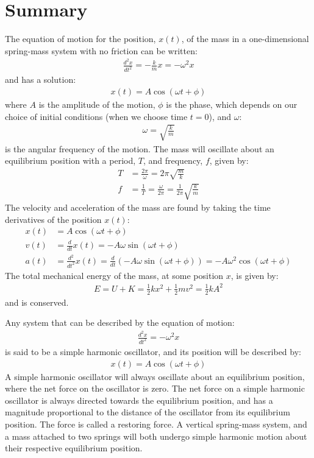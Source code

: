 \section{Summary}
\vspace{-0.25cm}
\begin{chapterSummary}
The equation of motion for the position, $x(t)$, of the mass in a one-dimensional spring-mass system with no friction can be written:
\begin{align*}
\frac{d^2x}{dt^2}=-\frac{k}{m}x = -\omega^2 x
\end{align*}
and has a solution:
\begin{align*}
x(t) = A\cos(\omega t + \phi)
\end{align*}
where $A$ is the amplitude of the motion, $\phi$ is the phase, which depends on our choice of initial conditions (when we choose time $t=0$), and $\omega$:
\begin{align*}
\omega = \sqrt{\frac{k}{m}}
\end{align*}
is the angular frequency of the motion. The mass will oscillate about an equilibrium position with a period, $T$, and frequency, $f$, given by:
\begin{align*}
T&=\frac{2\pi}{\omega}=2\pi\sqrt{\frac{m}{k}}\\
f&=\frac{1}{T}=\frac{\omega}{2\pi}=\frac{1}{2\pi}\sqrt{\frac{k}{m}}
\end{align*}
The velocity and acceleration of the mass are found by taking the time derivatives of the position $x(t)$:
\begin{align*}
x(t)&= A \cos(\omega t + \phi)\\
v(t)&=\frac{d}{dt}x(t) = -A\omega\sin(\omega t + \phi)\\
a(t)&= \frac{d^2}{dt^2}x(t) =\frac{d}{dt}\left( -A\omega\sin(\omega t + \phi)\right)= -A\omega^2\cos(\omega t + \phi)
\end{align*}
The total mechanical energy of the mass, at some position $x$, is given by:
\begin{align*}
E =U+K=\frac{1}{2}kx^2+\frac{1}{2}mv^2= \frac{1}{2}kA^2
\end{align*}
and is conserved. 

Any system that can be described by the equation of motion:
\begin{align*}
\frac{d^2x}{dt^2}= -\omega^2 x
\end{align*}
is said to be a simple harmonic oscillator, and its position will be described by:
\begin{align*}
x(t) = A\cos(\omega t + \phi)
\end{align*}
A simple harmonic oscillator will always oscillate about an equilibrium position, where the net force on the oscillator is zero. The net force on a simple harmonic oscillator is always directed towards the equilibrium position, and has a magnitude proportional to the distance of the oscillator from its equilibrium position. The force is called a restoring force. A vertical spring-mass system, and a mass attached to two springs will both undergo simple harmonic motion about their respective equilibrium position.


\end{chapterSummary}

